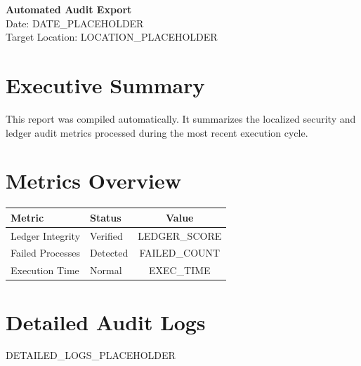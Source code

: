 \documentclass[11pt, a4paper]{article}
\begin{document}
\begin{center}
    {\Huge\bfseries Automated Audit Export} \\[0.5em]
    {\large Date: {{DATE_PLACEHOLDER}}} \\[0.5em]
    {\large Target Location: {{LOCATION_PLACEHOLDER}}}
\end{center}

\vspace{2em}

\section{\textcolor{primary}{Executive Summary}}
This report was compiled automatically. It summarizes the localized security and ledger audit metrics processed during the most recent execution cycle.

\section{\textcolor{primary}{Metrics Overview}}
\begin{table}[h]
    \centering
    \renewcommand{\arraystretch}{1.3}
    \begin{tabular}{@{}llc@{}}
        \toprule
        \textbf{Metric} & \textbf{Status} & \textbf{Value} \\
        \midrule
        Ledger Integrity & \textcolor{statusgreen}{Verified} & {{LEDGER_SCORE}} \\
        Failed Processes & \textcolor{statusred}{Detected} & {{FAILED_COUNT}} \\
        Execution Time & Normal & {{EXEC_TIME}} \\
        \bottomrule
    \end{tabular}
\end{table}

\section{\textcolor{primary}{Detailed Audit Logs}}
{{DETAILED_LOGS_PLACEHOLDER}}
\end{document}
